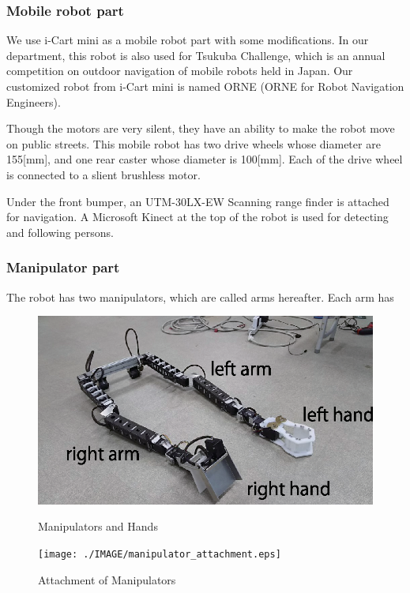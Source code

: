 \documentclass{llncs}
\begin{document}
\subsubsection{Mobile robot part}

We use i-Cart mini\cite{icartmini} as a mobile robot part
with some modifications. In our department, 
this robot is also used for Tsukuba Challenge,
which is an annual competition on outdoor navigation of mobile robots
held in Japan.
Our customized robot from i-Cart mini is named ORNE
(ORNE for Robot Navigation Engineers).

Though the motors are very silent, 
they have an ability to make the robot move on public streets.
This mobile robot has two drive wheels whose diameter are 155[mm], 
and one rear caster whose diameter is 100[mm].
Each of the drive wheel is connected to a slient brushless motor.

Under the front bumper, an UTM-30LX-EW Scanning range finder
is attached for navigation.
A Microsoft Kinect at the top of the robot is used for
detecting and following persons.


\subsubsection{Manipulator part}

The robot has two manipulators, which are called arms hereafter.
Each arm has 

\begin{figure}[h]
\begin{minipage}{21em}
	\begin{center}
		\includegraphics[width=0.95\linewidth]{./IMAGE/manipulators.eps}
		\caption{Manipulators and Hands}
		\label{fig:manipulators}
	\end{center}
\end{minipage}
\begin{minipage}{17em}
	\begin{center}
		\texttt{[image: ./IMAGE/manipulator\_attachment.eps]}
		\caption{Attachment of Manipulators}
		\label{fig:manipulator_attachment}
	\end{center}
\end{minipage}
\end{figure}
\end{document}
